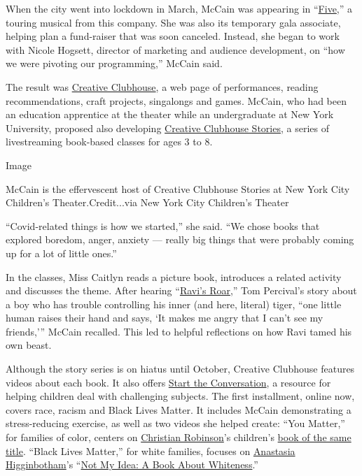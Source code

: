 When the city went into lockdown in March, McCain was appearing in
``\href{https://nycchildrenstheater.org/education/multi-sensory-musical/}{Five},''
a touring musical from this company. She was also its temporary gala
associate, helping plan a fund-raiser that was soon canceled. Instead,
she began to work with Nicole Hogsett, director of marketing and
audience development, on ``how we were pivoting our programming,''
McCain said.

The result was
\href{https://nycchildrenstheater.org/shows-and-programs/creative-clubhouse/}{Creative
Clubhouse}, a web page of performances, reading recommendations, craft
projects, singalongs and games. McCain, who had been an education
apprentice at the theater while an undergraduate at New York University,
proposed also developing
\href{https://nycchildrenstheater.org/shows-and-programs/creative-clubhouse-stories-caitlyn/}{Creative
Clubhouse Stories}, a series of livestreaming book-based classes for
ages 3 to 8.

Image

McCain is the effervescent host of Creative Clubhouse Stories at New
York City Children's Theater.Credit...via New York City Children's
Theater

``Covid-related things is how we started,'' she said. ``We chose books
that explored boredom, anger, anxiety --- really big things that were
probably coming up for a lot of little ones.''

In the classes, Miss Caitlyn reads a picture book, introduces a related
activity and discusses the theme. After hearing
``\href{https://www.kirkusreviews.com/book-reviews/tom-percival/ravis-roar/}{Ravi's
Roar},'' Tom Percival's story about a boy who has trouble controlling
his inner (and here, literal) tiger, ``one little human raises their
hand and says, `It makes me angry that I can't see my friends,''' McCain
recalled. This led to helpful reflections on how Ravi tamed his own
beast.

Although the story series is on hiatus until October, Creative Clubhouse
features videos about each book. It also offers
\href{https://www.kirkusreviews.com/book-reviews/tom-percival/ravis-roar/}{Start
the Conversation}, a resource for helping children deal with challenging
subjects. The first installment, online now, covers race, racism and
Black Lives Matter. It includes McCain demonstrating a stress-reducing
exercise, as well as two videos she helped create: ``You Matter,'' for
families of color, centers on
\href{https://www.nytimes3xbfgragh.onion/2020/06/05/us/talking-to-kids-about-racism.html}{Christian
Robinson}'s children's
\href{https://www.theartoffun.com/you-matter}{book of the same title}.
``Black Lives Matter,'' for white families, focuses on
\href{https://www.nytimes3xbfgragh.onion/2020/05/16/well/family/children-books-how-to-be-upset.html}{Anastasia
Higginbotham}'s ``\href{https://www.dottirpress.com/not-my-idea}{Not My
Idea: A Book About Whiteness}.''


